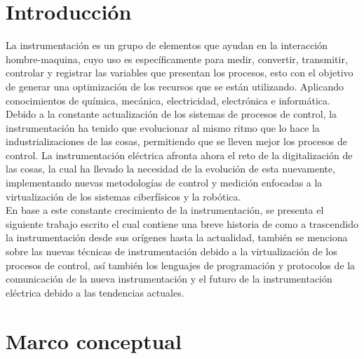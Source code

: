 \documentclass[12pt,letterpaper, onecolumn, titlepage, oneside]{book}
\begin{document}



\tableofcontents
\clearpage

\frontmatter

\chapter{Introducción}
La instrumentación es un grupo de elementos que ayudan en la interacción hombre-maquina, cuyo uso es específicamente para medir, convertir, transmitir, controlar y registrar las variables que presentan los procesos, esto con el objetivo de generar una optimización de los recursos que se están utilizando. Aplicando conocimientos de química, mecánica, electricidad, electrónica e informática.\\

Debido a la constante actualización de los sistemas de procesos de control, la instrumentación ha tenido que evolucionar al mismo ritmo que lo hace la industrializaciones de las cosas, permitiendo que se lleven mejor los procesos de control. La instrumentación eléctrica afronta ahora el reto de la digitalización de las cosas, la cual ha llevado la necesidad de la evolución de esta nuevamente, implementando nuevas metodologías de control y medición enfocadas a  la virtualización de los sistemas ciberfísicos y la robótica.\\

En base a este constante crecimiento de la instrumentación, se presenta el siguiente trabajo escrito el cual contiene una breve historia de como a trascendido la instrumentación desde sus orígenes hasta la actualidad, también se menciona sobre las nuevas técnicas de instrumentación debido a la virtualización de los procesos de control, así también los lenguajes de programación y protocolos de la comunicación de la nueva instrumentación y el futuro de la instrumentación eléctrica debido a las tendencias actuales.

\mainmatter
\chapter{Marco conceptual}
\end{document}
